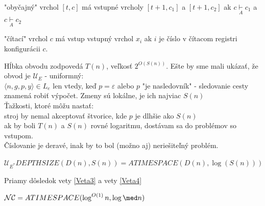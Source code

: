 \begin{dokaz}
\begin{description}
\item "obyčajný" vrchol $[t,c]$ má vstupné vrcholy $[t+1,c_1]$ a $[t+1,c_2]$ ak $c
\underset{A}{\vdash}c_1$ a $c \underset{A}{\vdash}c_2$
\item "čítací" vrchol $c$ má vstup vstupný vrchol $x_i$ ak $i$ je číslo v čítacom
registri konfigurácii $c$.
\end{description}
Hĺbka obvodu zodpovedá $T(n)$, veľkosť $2^{O(S(n))}$. Ešte by sme mali ukázať, že obvod
je $\mathcal{U}_E$ - uniformný:\\ $\langle n,g,p,y \rangle \in L_e$ len vtedy, keď
$p=\varepsilon$ alebo $p$ "je nasledovník" - sledovanie cesty znamená robiť výpočet.
Zmeny sú lokálne, je ich najviac $S(n)$\\ Ťažkosti, ktoré môžu nastať:\\ stroj by nemal
akceptovať štvorice, kde $p$ je dlhšie ako $S(n)$ \\ ak by boli $T(n)$ a $S(n)$ rovné
logaritmu, dostávam sa do problémov so vstupom.\\ Číslovanie je deravé, inak by to bol
(možno aj) neriešiteľný problém.
\end{dokaz}

\begin{veta}
$\mathcal{U}_{E^*}DEPTHSIZE(D(n),S(n))=ATIMESPACE(D(n),\log(S(n)))$
\end{veta}

\begin{dokaz}
Priamy dôsledok vety \ref{Veta3} a vety \ref{Veta4}
\end{dokaz}

\begin{dosledok}
$\mathcal{NC}=ATIMESPACE(\log^{O(1)}n,\log \med n)$
\end{dosledok}
